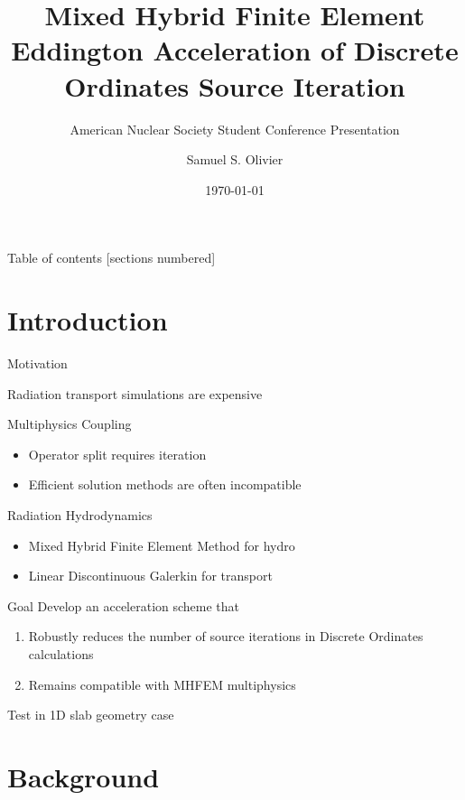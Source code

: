 \documentclass[10pt]{beamer}
\title{Mixed Hybrid Finite Element Eddington Acceleration of Discrete Ordinates Source Iteration}
\subtitle{\normalsize American Nuclear Society Student Conference Presentation}
\date{\today}
\author{Samuel S. Olivier }
\institute{Department of Nuclear Engineering, Texas A\&M University}
\begin{document}

\maketitle

\begin{frame}{Table of contents}
  [sections numbered]
  \tableofcontents[hideallsubsections]
\end{frame}

\section{Introduction}

\begin{frame}{Motivation}
    
    Radiation transport simulations are expensive 

    Multiphysics Coupling 
        \begin{itemize}
            \item Operator split requires iteration
            \item Efficient solution methods are often incompatible 
        \end{itemize}

    Radiation Hydrodynamics 
        \begin{itemize}
            \item Mixed Hybrid Finite Element Method for hydro 
            \item Linear Discontinuous Galerkin for transport 
        \end{itemize}

    \begin{block}{Goal}
        Develop an acceleration scheme that 
            \begin{enumerate}
                \item Robustly reduces the number of source iterations in Discrete Ordinates calculations 

                \item Remains compatible with MHFEM multiphysics 
            \end{enumerate}
        Test in 1D slab geometry case
    \end{block}

\end{frame}

\section{Background}
\end{document}
